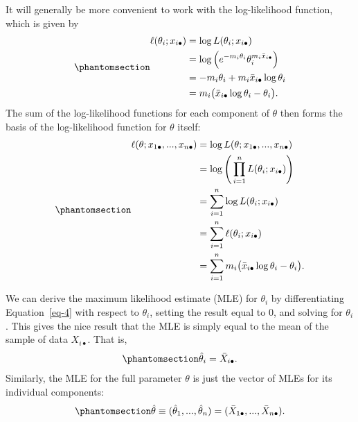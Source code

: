 \documentclass[
  12pt]{article}
\begin{document}
It will generally be more convenient to work with the log-likelihood
function, which is given by \begin{equation}\phantomsection\label{eq-4}{
\begin{aligned}
\ell(\theta_i; x_{i\bullet}) &= \log L(\theta_i; x_{i\bullet}) \\
                           &= \log \Big(e^{-m_i\theta_i}\theta_i^{m_i\bar{x}_{i\bullet}}\Big) \\
                           &= -m_i\theta_i + m_i \bar{x}_{i\bullet} \log \theta_i \\
                           &=  m_i\big(\bar{x}_{i\bullet} \log\theta_i - \theta_i \big).
\end{aligned}
}\end{equation} The sum of the log-likelihood functions for each
component of \(\theta\) then forms the basis of the log-likelihood
function for \(\theta\) itself:
\begin{equation}\phantomsection\label{eq-5}{
\begin{aligned}
\ell(\theta; x_{1\bullet}, ..., x_{n\bullet}) &= \log L(\theta; x_{1\bullet}, ..., x_{n\bullet}) \\
                                              &= \log \Bigg(\prod_{i=1}^n L(\theta_i; x_{i\bullet})\Bigg) \\
                                              &= \sum_{i=1}^n \log L(\theta_i; x_{i\bullet}) \\
                                              &= \sum_{i=1}^n \ell(\theta_i; x_{i\bullet}) \\
                                              &= \sum_{i=1}^n m_i\big(\bar{x}_{i\bullet} \log\theta_i - \theta_i \big).
\end{aligned}
}\end{equation}

We can derive the maximum likelihood estimate (MLE) for \(\theta_i\) by
differentiating Equation~\ref{eq-4} with respect to \(\theta_i\),
setting the result equal to 0, and solving for \(\theta_i\). This gives
the nice result that the MLE is simply equal to the mean of the sample
of data \(X_{i\bullet}\). That is,
\begin{equation}\phantomsection\label{eq-6}{
\hat{\theta}_i = \bar{X}_{i\bullet}.
}\end{equation} Similarly, the MLE for the full parameter \(\theta\) is
just the vector of MLEs for its individual components:
\begin{equation}\phantomsection\label{eq-7}{
\hat{\theta} \equiv (\hat{\theta}_1, ..., \hat{\theta}_n) = (\bar{X}_{1\bullet}, ..., \bar{X}_{n\bullet}).
}\end{equation}
\end{document}

